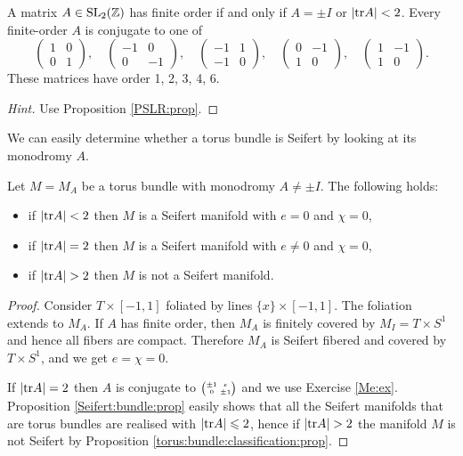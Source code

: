 \begin{ex} A matrix $A\in {\rm SL}_2(\mathbb{Z})$ has finite order if and only if $A=\pm I$ or $|{\rm tr} A| < 2$. Every finite-order $A$ is conjugate to one of
$$ 
\begin{pmatrix} 1 & 0 \\ 0 & 1 \end{pmatrix}, \quad
\begin{pmatrix} -1 & 0 \\ 0 & -1 \end{pmatrix}, \quad
\begin{pmatrix} -1 & 1 \\ -1 & 0 \end{pmatrix}, \quad
 \begin{pmatrix} 0 & -1 \\ 1 & 0 \end{pmatrix}, \quad
\begin{pmatrix} 1 & -1 \\ 1 & 0 \end{pmatrix}.
$$
These matrices have order 1, 2, 3, 4, 6.
\end{ex}
\begin{proof}[Hint]
Use Proposition \ref{PSLR:prop}.
\end{proof}

We can easily determine whether a torus bundle is Seifert by looking at its monodromy $A$.

\begin{prop} \label{torus:bundle:prop}
Let $M = M_A$ be a torus bundle with monodromy $A\neq \pm I$. The following holds:
\begin{itemize}
\item if $|{\rm tr} A| < 2$ then $M$ is a Seifert manifold with $e=0$ and $\chi = 0$,
\item if $|{\rm tr} A|=2$ then $M$ is a Seifert manifold with $e\neq 0$ and $\chi = 0$,
\item if $|\tr A|>2$ then $M$ is not a Seifert manifold.
\end{itemize}
\end{prop}
\begin{proof}
Consider $T \times [-1,1]$ foliated by lines $\{x\}\times [-1,1]$. The foliation extends to $M_A$. If $A$ has finite order, then $M_A$ is finitely covered by $M_I = T\times S^1$ and hence all fibers are compact. Therefore $M_A$ is Seifert fibered and covered by $T\times S^1$, and we get $e=\chi=0$. 

If $|{\rm tr} A|=2$ then $A$ is conjugate to $\matr {\pm 1}e0{\pm 1}$ and we use Exercise \ref{Me:ex}. Proposition \ref{Seifert:bundle:prop} easily shows that all the Seifert manifolds that are torus bundles are realised with $|{\rm tr} A| \leqslant 2$, hence if $|\tr A|>2$ the manifold $M$ is not Seifert by Proposition \ref{torus:bundle:classification:prop}.
\end{proof}

